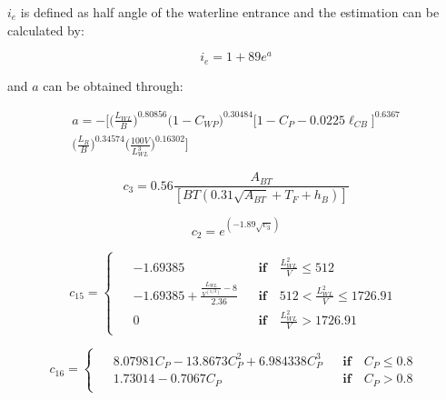 $i_e$ is defined as half angle of the waterline entrance and the estimation can be calculated by:

\begin{equation}\label{i_e}
    i_e = 1+89 e^{a}
\end{equation}

and $a$ can be obtained through:

\begin{multline}\label{eqn:a_const_ie}
    a = -\biggl[ \biggl(\frac{L_{WL}}{B}\biggr)^{0.80856} \biggl(1 - C_{WP}\biggr)^{0.30484} \biggl[1 - C_P - 0.0225\ell_{CB}\biggr]^{0.6367} \\
    \biggl(\frac{L_R}{B}\biggr)^{0.34574} \biggl(\frac{100V}{L_{WL}^3}\biggr)^{0.16302} \biggr]
\end{multline}

\begin{equation}\label{eqn:c3}
    c_3 = 0.56 \frac{A_{BT}}{\left[BT\left(0.31 \sqrt{A_{BT}} + T_F + h_B\right)\right]}
\end{equation}

\begin{equation}\label{eqn:c2}
    c_2 = e^{(-1.89\sqrt{c_3})}
\end{equation}

\begin{equation}
    \label{eqn:c15}
    c_{15} =
    \begin{cases}
        \begin{aligned}
            & -1.69385 && \textbf{if} \quad \frac{L_{WL}^2}{V} \leqslant 512 \\
            & -1.69385 + \frac{\frac{L_{WL}}{V^{(1/3)}}-8}{2.36}&& \textbf{if} \quad 512 < \frac{L_{WL}^2}{V} \leqslant 1726.91 \\
            & 0 && \textbf{if} \quad \frac{L_{WL}^2}{V} > 1726.91
        \end{aligned}
    \end{cases}
\end{equation}

\begin{equation}
    \label{eqn:c16}
    c_{16} = 
    \begin{cases}
        \begin{aligned}
            & 8.07981C_P - 13.8673C_P^2 + 6.984338C_P^3 && \textbf{if} \quad C_P \leqslant 0.8 \\
            & 1.73014 - 0.7067C_P && \textbf{if} \quad C_P > 0.8
        \end{aligned}
    \end{cases}
\end{equation}

